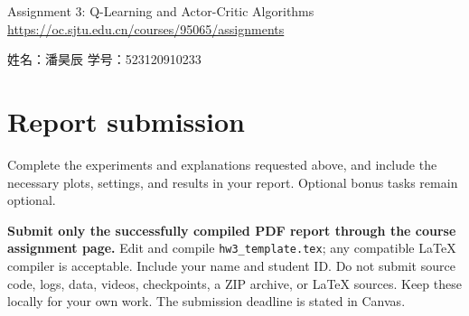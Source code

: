 \usepackage{xcolor}
\usepackage{titleps}
\usepackage[letterpaper, margin=0.95in]{geometry}
\usepackage{url}
\usepackage{amsmath}
\usepackage{amsfonts}
\usepackage{amssymb}
\usepackage{wrapfig}
\usepackage{float}
\usepackage{mathtools}
\usepackage{enumitem}
\usepackage{tabu}
\usepackage{parskip}
\usepackage{natbib}
\usepackage{listings}
\usepackage{tcolorbox}
\usepackage{algorithm}
\usepackage{algpseudocode}
\usepackage{forest}
\usepackage{hyperref}
\usepackage[color=red]{todonotes}
\usepackage{forest}
\usepackage{cleveref}

\newcommand{\xb}{\mathbf{x}}
\newcommand{\yb}{\mathbf{y}}
\newcommand{\wb}{\mathbf{w}}
\newcommand{\Xb}{\mathbf{X}}
\newcommand{\Yb}{\mathbf{Y}}
\newcommand{\tr}{^T}
\newcommand{\hb}{\mathbf{h}}
\newcommand{\Hb}{\mathbf{H}}


{\headrule
  \setfoot{}{\ifsolutions\LARGE\bf\textcolor{red}{Answer Key}\fi}{}}
\pagestyle{ruled}

\renewcommand\makeheadrule{\color{black}\rule[-.75\baselineskip]{\linewidth}{0.4pt}}
\renewcommand*\footnoterule{}



\begin{centering}
    {\Large Assignment 3: Q-Learning and Actor-Critic Algorithms} \\
\url{https://oc.sjtu.edu.cn/courses/95065/assignments} \\
\end{centering}
\begin{center}
    姓名：潘昊辰 \qquad 学号：523120910233
\end{center}





\section{Report submission}
Complete the experiments and explanations requested above, and include the necessary plots, settings, and results in your report. Optional bonus tasks remain optional.

\textbf{Submit only the successfully compiled PDF report through the course assignment page.} Edit and compile \texttt{hw3\_template.tex}; any compatible LaTeX compiler is acceptable. Include your name and student ID. Do not submit source code, logs, data, videos, checkpoints, a ZIP archive, or LaTeX sources. Keep these locally for your own work. The submission deadline is stated in Canvas.

